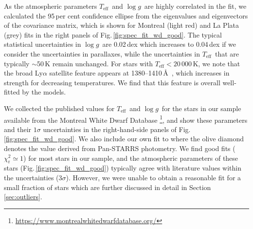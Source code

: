 \documentclass[fleqn,usenatbib, useAMS]{mnras}
\newcommand{\Teff}{\mbox{$T_{\mathrm{eff}}$}}
\newcommand{\logg}{\mbox{$\log g$}}
\begin{document}
As the atmospheric parameters \Teff\ and \logg\ are highly correlated in the fit, we calculated the 95\,per cent confidence ellipse from the eigenvalues and eigenvectors of the covariance matrix, which is shown for Montreal (light red) and La Plata (grey) fits in the right panels of Fig.\,\ref{fig:spec_fit_wd_good}. The typical statistical uncertainties in \logg\ are 0.02\,dex which increases to 0.04\,dex if we consider the uncertainties in parallaxes, while the uncertainties in \Teff\ that are typically $\sim$50\,K remain unchanged. For stars with $\Teff<20\,000$\,K, we note that the broad Ly$\alpha$ satellite  feature appears at 1380--1410\,\AA\ \citep{1985A&A...142L...5K}, which increases in strength for decreasing temperatures. We find that this feature is overall well-fitted by the models.

We collected the published values for \Teff\ and \logg\  for the stars in our sample available from the Montreal White Dwarf Database \citep[MWDD]{mwdd}\footnote{\url{https://www.montrealwhitedwarfdatabase.org/}}, and show these parameters and their $1\sigma$ uncertainties in the right-hand-side panels of Fig.\,\ref{fig:spec_fit_wd_good}. We also include our own fit to where the olive diamond denotes the value derived from Pan-STARRS photometry.
We find good fits ($\chi^{2}_\mathrm{r}\simeq1$) for most stars in our sample, and the atmospheric parameters of these stars (Fig.\,\ref{fig:spec_fit_wd_good}) typically agree with literature values within the uncertainties ($3\sigma$). However, we were unable to obtain a reasonable fit for a small fraction of stars which are further discussed in detail in Section\,\ref{sec:outliers}. 
\end{document}
